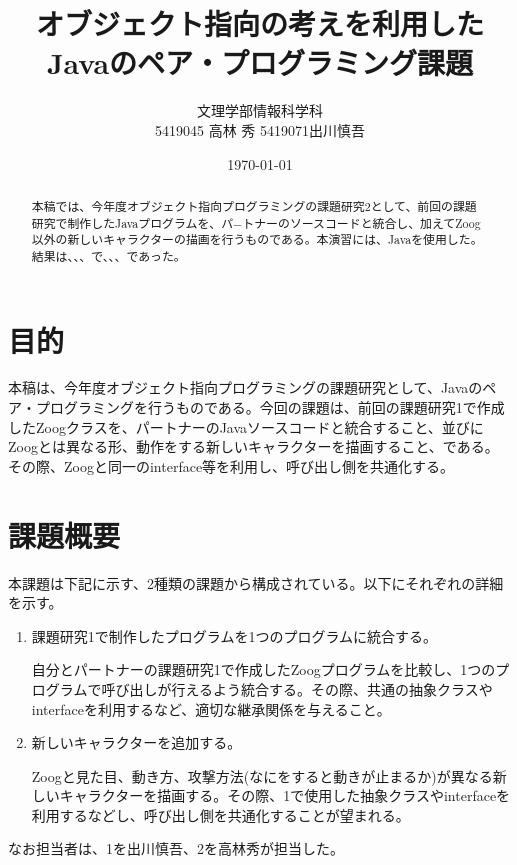 \documentclass[dvipdfmx]{jsarticle}
\title{オブジェクト指向の考えを利用したJavaのペア・プログラミング課題}
\author{文理学部情報科学科\\5419045 高林 秀 5419071出川慎吾}
\date{\today}
\begin{document}
\maketitle

\begin{abstract}
  本稿では、今年度オブジェクト指向プログラミングの課題研究2として、前回の課題研究で制作したJavaプログラムを、パ−トナーのソースコードと統合し、加えてZoog以外の新しいキャラクターの描画を行うものである。本演習には、Javaを使用した。
  結果は、、、で、、、であった。
\end{abstract}

\section{目的}
本稿は、今年度オブジェクト指向プログラミングの課題研究として、Javaのペア・プログラミングを行うものである。今回の課題は、前回の課題研究1で作成したZoogクラスを、パートナーのJavaソースコードと統合すること、並びにZoogとは異なる形、動作をする新しいキャラクターを描画すること、である。その際、Zoogと同一のinterface等を利用し、呼び出し側を共通化する。

\section{課題概要}
本課題は下記に示す、2種類の課題から構成されている。以下にそれぞれの詳細を示す。
\begin{enumerate}
  \item 課題研究1で制作したプログラムを1つのプログラムに統合する。\par
  自分とパートナーの課題研究1で作成したZoogプログラムを比較し、1つのプログラムで呼び出しが行えるよう統合する。その際、共通の抽象クラスやinterfaceを利用するなど、適切な継承関係を与えること。
  \item 新しいキャラクターを追加する。\par
  Zoogと見た目、動き方、攻撃方法(なにをすると動きが止まるか)が異なる新しいキャラクターを描画する。その際、1で使用した抽象クラスやinterfaceを利用するなどし、呼び出し側を共通化することが望まれる。
\end{enumerate}
なお担当者は、1を出川慎吾、2を高林秀が担当した。
\end{document}
